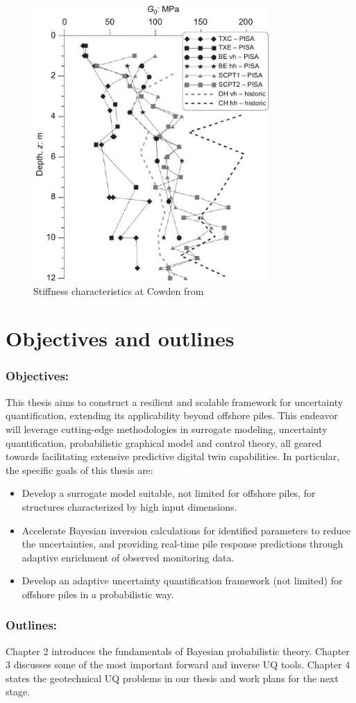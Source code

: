 \begin{figure}[htbp]
    \center
    \includegraphics[width = 90mm]{Figures/figure-Cowden.pdf}
    \caption{Stiffness characteristics at Cowden from \protect\cite{zdravkovic2020}}
    \label{fig: Cowden_cpt}
\end{figure}






\section{Objectives and outlines}
\subsubsection{Objectives:}
This thesis aims to construct a resilient and scalable framework for uncertainty quantification, extending its applicability beyond offshore piles. This endeavor will leverage cutting-edge methodologies in surrogate modeling, uncertainty quantification, probabilistic graphical model and control theory, all geared towards facilitating extensive predictive digital twin capabilities. In particular, the specific goals of this thesis are:
\begin{itemize}[left=0pt]
    \item Develop a surrogate model suitable, not limited for offshore piles, for structures characterized by high input dimensions.
    
    \item Accelerate Bayesian inversion calculations for identified parameters to reduce the uncertainties, and providing real-time pile response predictions through adaptive enrichment of observed monitoring data.
    
    \item Develop an adaptive uncertainty quantification framework (not limited) for offshore piles in a probabilistic way.

  
\end{itemize}


\subsubsection{Outlines:}
Chapter 2 introduces the fundamentals of Bayesian probabilistic theory.
Chapter 3 discusses some of the most important forward and inverse UQ tools.
Chapter 4 states the geotechnical UQ problems in our thesis and work plans for the next stage.
